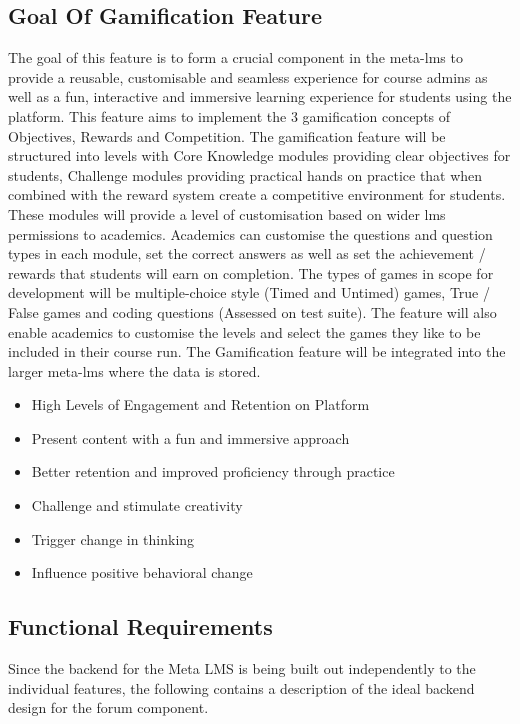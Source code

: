 \subsection{Goal Of Gamification Feature}
The goal of this feature is to form a crucial component in the meta-lms to provide a reusable, customisable and seamless experience for course admins as well as a fun, interactive and immersive learning experience for students using the platform. This feature aims to implement the 3 gamification concepts of Objectives, Rewards and Competition. 
The gamification feature will be structured into levels with Core Knowledge modules providing clear objectives for students, Challenge modules providing practical hands on practice that when combined with the reward system create a competitive environment for students. These modules will provide a level of customisation based on wider lms permissions to academics. Academics can customise the questions and question types in each module, set the correct answers as well as set the achievement / rewards that students will earn on completion.
The types of games in scope for development will be multiple-choice style (Timed and Untimed) games, True / False games and coding questions (Assessed on test suite). The feature will also enable academics to customise the levels and select the games they like to be included in their course run. The Gamification feature will be integrated into the larger meta-lms where the data is stored.

\begin{itemize}
    \item High Levels of Engagement and Retention on Platform
    \item Present content with a fun and immersive approach
    \item Better retention and improved proficiency through practice
    \item Challenge and stimulate creativity
    \item Trigger change in thinking
    \item Influence positive behavioral change
\end{itemize}

\newpage


\subsection{Functional Requirements}
Since the backend for the Meta LMS is being built out independently to the individual features, the following contains a description of the ideal backend design for the forum component.

